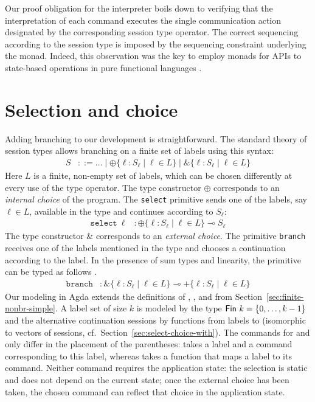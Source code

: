 \documentclass[acmsmall,screen,anonymous,review]{acmart}
\begin{document}
Our proof obligation for the interpreter boils down to verifying that
the interpretation of each command executes the single communication
action designated by the corresponding session type operator. The
correct sequencing according to the session type is imposed by the
sequencing constraint underlying the {\AIO} monad. Indeed, this
observation was the key to employ monads for APIs to state-based
operations in pure functional languages \cite{DBLP:conf/popl/JonesW93}.

\section{Selection and choice}
\label{sec:select-choice}

Adding branching to our development is straightforward. The standard 
theory of session types allows branching on a finite set of labels using this syntax:
\begin{align*}
  S & ::= \dots \mid \oplus\{ \ell : S_\ell \mid \ell \in L \} \mid
      \&\{\ell: S_\ell \mid \ell \in L\}
\end{align*}
Here $L$ is a finite, non-empty set of labels, which can be chosen differently at
every use of the type operator. 
The type constructor $\oplus$ corresponds to an \emph{internal choice} of the
program.  The \texttt{select} primitive sends one of the labels, say $\ell \in L$, available in the
type and continues according to $S_\ell$:
\begin{align*}
  \mathtt{select}\ \ell &: \oplus\{ \ell : S_\ell \mid \ell \in L \}
                          \multimap S_\ell
\end{align*}
The type constructor $\&$ corresponds to an \emph{external choice}. The
primitive \texttt{branch} receives one of the labels 
mentioned in the type and chooses a continuation according to the
label. In the presence of sum types and linearity, the primitive can be typed as
follows \cite{DBLP:journals/toplas/Padovani19}.
\begin{align*}
  \mathtt{branch} &: \&\{\ell: S_\ell \mid \ell \in L\} \multimap +\{\ell: S_\ell \mid \ell \in L\}
\end{align*}
Our modeling in Agda extends the definitions of
{\ASession}, {\ACommand}, and {\Aexecutor} from
Section~\ref{sec:finite-nonbr-simple}. A label set of size $k$ is
modeled by the type $\AFin~k = \{ 0, \dots, k-1\}$ and the alternative continuation sessions by
functions from labels to {\ASession} (isomorphic to vectors of sessions, cf.\  Section~\ref{sec:select-choice-with}).
\stBranchingType
\stBranchingCommand
The commands for {\ACSELECT} and {\ACCHOICE} only differ in the
placement of the parentheses: {\ACSELECT} takes a label and a command
corresponding to this label, whereas {\ACCHOICE} takes a function that
maps a label to its command. Neither command requires the application
state: the selection is static and does not depend on the current
state; once the external choice has been taken, the chosen command can
reflect that choice in the application state.
\stExecutorSignature\vspace{-1.5\baselineskip}
\stBranchingExecutor
\end{document}
